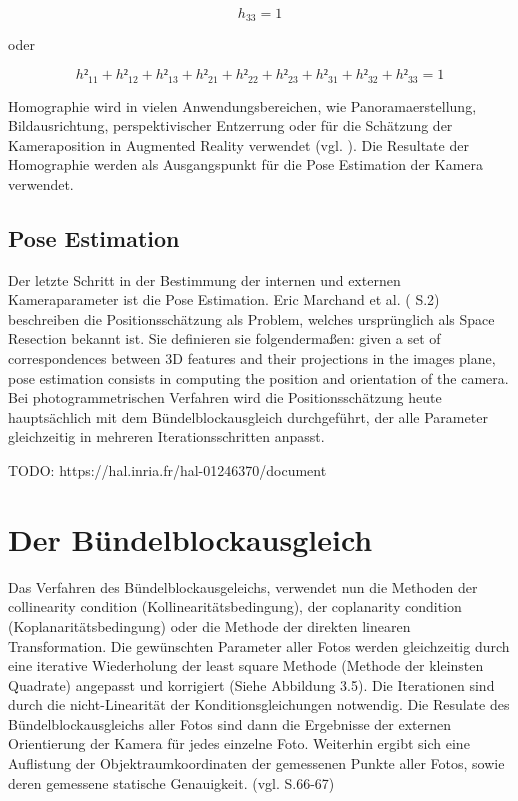 \begin{equation}
h_33 = 1
\end{equation}

oder 

\begin{equation}
h²_{11} + h²_{12} + h²_{13} + h²_{21} + h²_{22} + h²_{23} + h²_{31} + h²_{32} + h²_{33} = 1
\end{equation}

Homographie wird in vielen Anwendungsbereichen, wie Panoramaerstellung, Bildausrichtung, perspektivischer Entzerrung oder für die Schätzung der Kameraposition in Augmented Reality verwendet (vgl. \cite{homography}). Die Resultate der Homographie werden als Ausgangspunkt für die Pose Estimation der Kamera verwendet. 

\subsection{Pose Estimation}

Der letzte Schritt in der Bestimmung der internen und externen Kameraparameter ist die Pose Estimation. Eric Marchand et al. (\cite{pose_estimation} S.2) beschreiben die Positionsschätzung als Problem, welches ursprünglich als \glqq Space Resection\grqq{} bekannt ist. Sie definieren sie folgendermaßen: \glqq given a set of correspondences between 3D features and their projections in the images plane, pose estimation consists in computing the position and orientation of the camera\grqq{}. Bei photogrammetrischen Verfahren wird die Positionsschätzung heute hauptsächlich mit dem Bündelblockausgleich durchgeführt, der alle Parameter gleichzeitig in mehreren Iterationsschritten anpasst.

TODO: https://hal.inria.fr/hal-01246370/document


\section{Der Bündelblockausgleich}

Das Verfahren des Bündelblockausgeleichs, verwendet nun die Methoden der \glqq collinearity condition \grqq{} (Kollinearitätsbedingung), der \glqq coplanarity condition\grqq{} (Koplanaritätsbedingung) oder die Methode der direkten linearen Transformation. Die gewünschten Parameter aller Fotos werden gleichzeitig durch eine iterative Wiederholung der \glqq least square\grqq{} Methode (Methode der kleinsten Quadrate) angepasst und korrigiert (Siehe Abbildung 3.5). Die Iterationen sind durch die nicht-Linearität der Konditionsgleichungen notwendig. Die Resulate des Bündelblockausgleichs aller Fotos sind dann die Ergebnisse der externen Orientierung der Kamera für jedes einzelne Foto. Weiterhin ergibt sich eine Auflistung der Objektraumkoordinaten der gemessenen Punkte aller Fotos, sowie deren gemessene statische Genauigkeit. (vgl. \cite{comparative_conditions_study} S.66-67)

